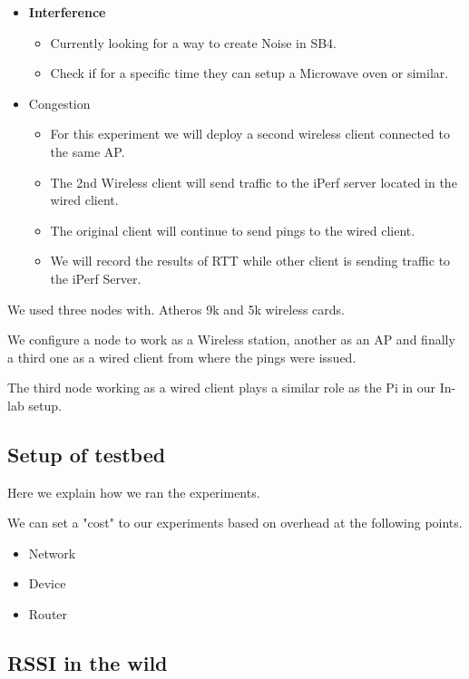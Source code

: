 \begin{itemize}
	\item \textbf{Interference}
	\begin{itemize}
		\item Currently looking for a way to create Noise in SB4.
		\item Check if for a specific time they can setup a Microwave oven or similar.
		
	\end{itemize}
	
	
	
	\item Congestion
	\begin{itemize}
		\item For this experiment we will deploy a second wireless client connected to the same AP.
		\item The 2nd Wireless client will send traffic to the iPerf server located in the wired client.
		\item The original client will continue to send pings to the wired client.
		\item We will record the results of RTT while other client is sending traffic to the iPerf Server.
		
	\end{itemize}
	
	
\end{itemize}


We used three nodes with.
Atheros 9k and 5k wireless cards.

We configure a node to work as a Wireless station, another as an AP and finally a third one as a wired client from where the pings were issued.

The third node working as a wired client plays a similar role as the Pi in our In-lab setup.


\subsection{Setup of testbed}

Here we explain how we ran the experiments.

We can set a "cost" to our experiments based on overhead at the following points.

\begin{itemize}
	\item Network
	\item Device
	\item Router
\end{itemize}


\subsection{RSSI in the wild}

